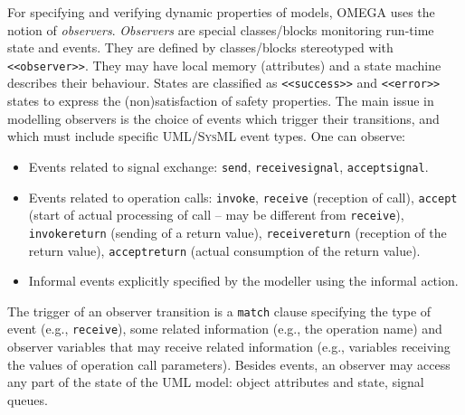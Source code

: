 \documentclass[a4paper,twoside]{article}
\def\sysml{\textsc{SysML}}
\def\uml{\textsc{UML}}
\begin{document}

For specifying and verifying dynamic properties of models, OMEGA uses the notion of \textit{observers}. \textit{Observers} are special classes/blocks monitoring run-time state and events. They are defined by classes/blocks stereotyped with \texttt{<<observer>>}. They may have local memory (attributes) and a state machine describes their behaviour. States are classified as \texttt{<<success>>} and \texttt{<<error>>} states to express the (non)satisfaction of safety properties. The main issue in modelling observers is the choice of events which trigger their transitions, and which must include specific \uml{}/\sysml{} event types. One can observe:
\begin{itemize}
\item Events related to signal exchange: \texttt{send}, \texttt{receivesignal}, \texttt{acceptsignal}.
\item Events related to operation calls: \texttt{invoke}, \texttt{receive} (reception of call), \texttt{accept} (start of actual processing of call -- may be different from \texttt{receive}), \texttt{invokereturn} (sending of a 
return 	value), \texttt{receivereturn} (reception of the return value), \texttt{acceptreturn} (actual consumption of the return value).
\item Informal events explicitly specified by the modeller using the informal action.
\end{itemize}
The trigger of an observer transition is a \texttt{match} clause specifying the type of event (e.g., \texttt{receive}), some related information (e.g., the operation name) and observer variables that may receive related information (e.g., variables receiving the values of operation call parameters). Besides events, an observer may access any part of the state of the \uml{} model: object attributes and state, signal queues. 





\end{document}
